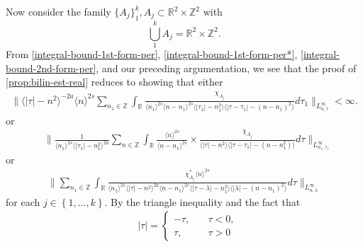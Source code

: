\documentclass[12pt,reqno]{amsart}
\numberwithin{equation}{section}  %
\numberwithin{figure}{section}
\newcommand{\rr}{\mathbb{R}}
\newcommand{\zz}{\mathbb{Z}}
\theoremstyle{plain}
\theoremstyle{definition}
\theoremstyle{remark}
\begin{document}
%
%
Now consider the family $\{A_{j}\}_{1}^{k}, A_{j} \subset \rr^{2} \times
\zz^{2}$ with
$$\bigcup_{1}^{k} A_{j}= \rr^{2} \times
\zz^{2}.$$ From \eqref{integral-bound-1st-form-per},
\eqref{integral-bound-1st-form-per*},
\eqref{integral-bound-2nd-form-per}, and our preceding argumentation,
we see that the proof of \autoref{prop:bilin-est-real} reduces to showing that
either 
%
%
%
%
\begin{equation}
  \label{key-sup-estimate-per-1}
  \begin{split}
     \| \langle | \tau | - n^{2} \rangle ^{-2a} \langle n
    \rangle ^{2s}
    \sum_{n_{1} \in \zz}
    \int_{\rr} \frac{\chi_{A_{j}}}{ \langle n_{1} \rangle ^{2s} \langle
n-n_{1} \rangle ^{2s} \langle | \tau_{1}|-n_{1}^{2} \rangle  \langle  |\tau -
    \tau_{1} | -(n - n_{1})^{2}
    \rangle  } d \tau_1  \|_{L^\infty_{n, \tau}} < \infty.
  \end{split}
\end{equation}
%
or
\begin{equation}
  \label{key-sup-estimate-per-2}
\begin{split}
  & \| \frac{1}{\langle n_{1} \rangle ^{2s}
  \langle | \tau_{1} | - n_{1}^{2} \rangle
  ^{2a}} \sum_{n \in \zz} \int_{\rr} \frac{\langle n \rangle ^{2s}}{\langle
  n - n_{1}\rangle ^{2s}}  \times \frac{\chi_{A_{j}}}{\langle | \tau | - n^{2} \rangle  \langle | \tau -
  \tau_{1} | - (n - n_{1}^{2}) \rangle } d \tau 
  \|_{L^{\infty}_{n_{1}, \tau_{1}}}
\end{split}
\end{equation}
or
%
%
\begin{equation}
  \label{key-sup-estimate-per-3}
\begin{split}
  \| \sum_{n_{1} \in \zz} \int_{\rr} \frac{\chi^{*}_{A_{j}}
    \langle n \rangle ^{2s}
    }{ \langle n_{1} \rangle^{2s} \langle | \tau | - n^{2}
    \rangle ^{2a}  \langle
n-n_{1} \rangle ^{2s}  \langle | \tau - \lambda|-n_{1}^{2}
\rangle \langle  | \lambda | -(n - n_{1})^{2}
\rangle } d \tau  \|_{L^{\infty}_{n, \lambda}}
\end{split}
\end{equation}
%
%
for each $j \in \left\{ 1,\dots,k \right\}$. 
By the triangle inequality and the fact that 
%
%
\begin{equation*}
\begin{split}
& | \tau | =
\begin{cases}
  - \tau, \quad & \tau < 0, 
\\
\tau, \quad & \tau > 0
\end{cases}
\end{split}
\end{equation*}
\end{document}
